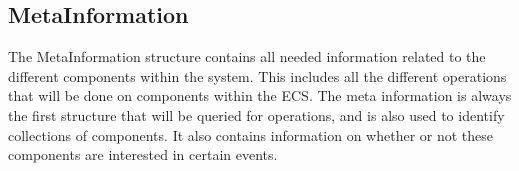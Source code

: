 \subsection{MetaInformation}

The MetaInformation structure contains all needed information related to the different components within the system.
This includes all the different operations that will be done on components within the ECS.
The meta information is always the first structure that will be queried for operations, and is also used to identify collections of components.
It also contains information on whether or not these components are interested in certain events.
